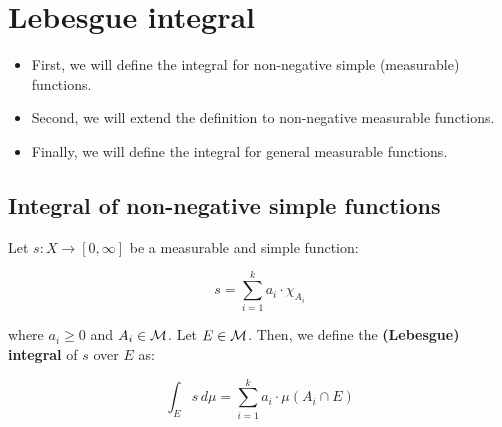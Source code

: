 \chapter{Lebesgue integral}

\begin{itemize}
    \item First, we will define the integral for non-negative simple (measurable)
    functions.

    \item Second, we will extend the definition to non-negative measurable functions.
    
    \item Finally, we will define the integral for general measurable functions.
\end{itemize}

\section{Integral of non-negative simple functions}

\begin{fdefinition}

    Let $s: X \to [0, \infty]$ be a measurable and simple function:

    $$s = \sum_{i = 1}^k a_i \cdot \chi_{A_i}$$

    where $a_i \geq 0$ and $A_i \in \mathcal{M}$. Let $E \in \mathcal{M}$. Then, we define the
    \textbf{(Lebesgue) integral} of $s$ over $E$ as:

    $$\int_{E} s \, d\mu = \sum_{i = 1}^k a_i \cdot \mu(A_i \cap E)$$
    
\end{fdefinition}

